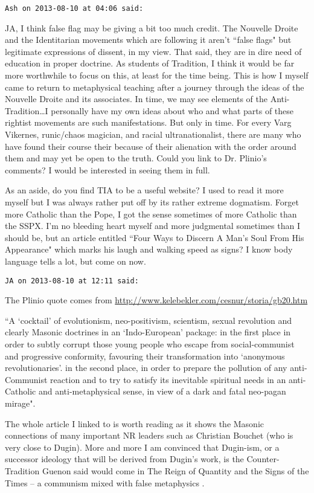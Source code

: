 \begin{footnotesize}
\begin{sffamily}
\hfill

\texttt{Ash on 2013-08-10 at 04:06 said: }

JA, I think false flag may be giving a bit too much credit. The Nouvelle Droite and the Identitarian movements which are following it aren't ``false flags" but legitimate expressions of dissent, in my view. That said, they are in dire need of education in proper doctrine. As students of Tradition, I think it would be far more worthwhile to focus on this, at least for the time being. This is how I myself came to return to metaphysical teaching after a journey through the ideas of the Nouvelle Droite and its associates. In time, we may see elements of the Anti-Tradition…I personally have my own ideas about who and what parts of these rightist movements are such manifestations. But only in time. For every Varg Vikernes, runic/chaos magician, and racial ultranationalist, there are many who have found their course their because of their alienation with the order around them and may yet be open to the truth. Could you link to Dr. Plinio's comments? I would be interested in seeing them in full.

As an aside, do you find TIA to be a useful website? I used to read it more myself but I was always rather put off by its rather extreme dogmatism. Forget more Catholic than the Pope, I got the sense sometimes of more Catholic than the SSPX. I'm no bleeding heart myself and more judgmental sometimes than I should be, but an article entitled ``Four Ways to Discern A Man's Soul From His Appearance" which marks his laugh and walking speed as signs? I know body language tells a lot, but come on now.


\hfill

\texttt{JA on 2013-08-10 at 12:11 said: }

The Plinio quote comes from \url{http://www.kelebekler.com/cesnur/storia/gb20.htm}

``A `cocktail' of evolutionism, neo-positivism, scientism, sexual revolution and clearly Masonic doctrines in an `Indo-European' package: in the first place in order to subtly corrupt those young people who escape from social-communist and progressive conformity, favouring their transformation into `anonymous revolutionaries'. in the second place, in order to prepare the pollution of any anti-Communist reaction and to try to satisfy its inevitable spiritual needs in an anti-Catholic and anti-metaphysical sense, in view of a dark and fatal neo-pagan mirage". 

The whole article I linked to is worth reading as it shows the Masonic connections of many important NR leaders such as Christian Bouchet (who is very close to Dugin). More and more I am convinced that Dugin-ism, or a successor ideology that will be derived from Dugin's work, is the Counter-Tradition Guenon said would come in The Reign of Quantity and the Signs of the Times – a communism mixed with false metaphysics .


\end{sffamily}
\end{footnotesize}
